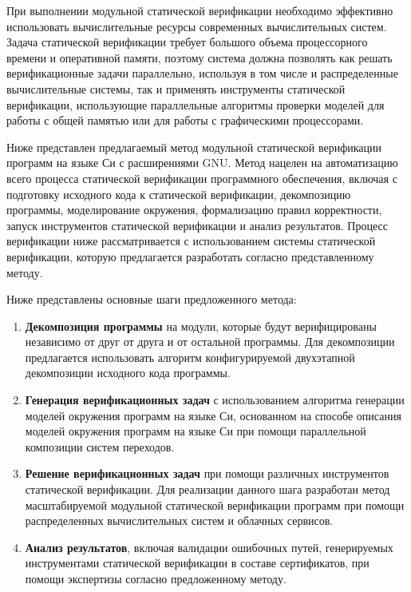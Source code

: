 \documentclass[%
candidate,     %
href,        %
colorlinks,  %
]{disser}
\begin{document}
При выполнении модульной статической верификации необходимо эффективно использовать вычислительные ресурсы современных вычислительных систем.
Задача статической верификации требует большого объема процессорного времени и оперативной памяти, поэтому система должна позволять как решать верификационные задачи параллельно, используя в том числе и распределенные вычислительные системы, так и применять инструменты статической верификации, использующие параллельные алгоритмы проверки моделей для работы с общей памятью или для работы с графическими процессорами. 

Ниже представлен предлагаемый метод модульной статической верификации программ на языке Си с расширениями GNU.
Метод нацелен на автоматизацию всего процесса статической верификации программного обеспечения, включая с подготовку исходного кода к статической верификации, декомпозицию программы, моделирование окружения, формализацию правил корректности, запуск инструментов статической верификации и анализ результатов.
Процесс верификации ниже рассматривается с использованием системы статической верификации, которую предлагается разработать согласно представленному методу.

Ниже представлены основные шаги предложенного метода:
\begin{enumerate}
\item \textbf{Декомпозиция программы} на модули, которые будут верифицированы независимо от друг от друга и от остальной программы. Для декомпозиции предлагается использовать алгоритм конфигурируемой двухэтапной декомпозиции исходного кода программы.
\item \textbf{Генерация верификационных задач} с использованием алгоритма генерации моделей окружения программ на языке Си, основанном на способе описания моделей окружения программ на языке Си при помощи параллельной композиции систем переходов.
\item \textbf{Решение верификационных задач} при помощи различных инструментов статической верификации. Для реализации данного шага разработан метод масштабируемой модульной статической верификации программ при помощи распределенных вычислительных систем и облачных сервисов.
\item \textbf{Анализ результатов}, включая валидации ошибочных путей, генерируемых инструментами статической верификации в составе сертификатов, при помощи экспертизы согласно предложенному методу. 
\end{enumerate}
\end{document}
